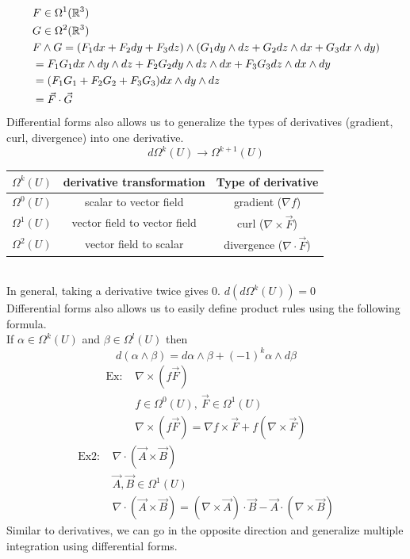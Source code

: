 \documentclass[11pt, fleqn]{article}
\begin{document}
\begin{align*}
    &F\in\Omega^1(\mathbb{R}^3)\\
    &G\in\Omega^2(\mathbb{R}^3)\\
    &F\wedge G=(F_1dx+F_2dy+F_3dz)\wedge(G_1dy\wedge dz+G_2dz\wedge dx+G_3dx\wedge dy)\\
    &=F_1G_1dx\wedge dy\wedge dz+F_2G_2 dy\wedge dz\wedge dx+F_3G_3 dz\wedge dx\wedge dy\\
    &=(F_1G_1+F_2G_2+F_3G_3)dx\wedge dy\wedge dz\\
    &=\vec{F}\cdot \vec{G}
\end{align*}
Differential forms also allows us to generalize the types of derivatives (gradient, curl, divergence) into one derivative.
$$d\Omega^k(U)\to\Omega^{k+1}(U)$$
\begin{tabular}{c|c|c}
    $\Omega^k(U)$ & derivative transformation & Type of derivative\\
    \hline
    $\Omega^0(U)$ & scalar to vector field & gradient ($\nabla f$)\\
    $\Omega^1(U)$ & vector field to vector field & curl ($\nabla\times \vec{F}$)\\
    $\Omega^2(U)$ & vector field to scalar & divergence ($\nabla\cdot\vec{F}$)
\end{tabular}\\
In general, taking a derivative twice gives 0. $d(d\Omega^k(U))=0$\\
Differential forms also allows us to easily define product rules using the following formula.\\
If $\alpha\in\Omega^k(U)$ and $\beta\in\Omega^l(U)$ then
$$d(\alpha\wedge\beta)=d\alpha\wedge\beta+(-1)^k\alpha\wedge d\beta$$
\begin{align*}
    \text{Ex: }&\nabla\times(f\vec{F})\\
    &f\in\Omega^0(U),\ \vec{F}\in\Omega^1(U)\\
    &\nabla\times(f\vec{F})=\nabla f\times\vec{F}+f(\nabla\times\vec{F})
\end{align*}
\begin{align*}
    \text{Ex2: }&\nabla\cdot(\vec{A}\times\vec{B})\\
    &\vec{A},\vec{B}\in\Omega^1(U)\\
    &\nabla\cdot(\vec{A}\times\vec{B})=(\nabla\times\vec{A})\cdot\vec{B}-\vec{A}\cdot(\nabla\times\vec{B})
\end{align*}
Similar to derivatives, we can go in the opposite direction and generalize multiple integration using differential forms.\\
\end{document}
